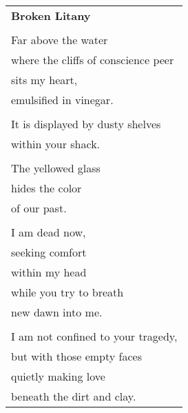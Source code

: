 \documentclass{article}
\begin{document}
\begin{center}
\begin{tabular}{l}
\textbf{Broken Litany} \\
\\
Far above the water \\
where the cliffs of conscience peer \\
sits my heart, \\
emulsified in vinegar. \\
\\
It is displayed by dusty shelves \\
within your shack. \\
\\
The yellowed glass \\
hides the color \\
of our past. \\
\\
I am dead now, \\
seeking comfort \\
within my head \\
while you try to breath \\
new dawn into me. \\
\\
I am not confined to your tragedy, \\
but with those empty faces \\
quietly making love \\
beneath the dirt and clay. \\
\end{tabular}
\end{center}
\end{document}

